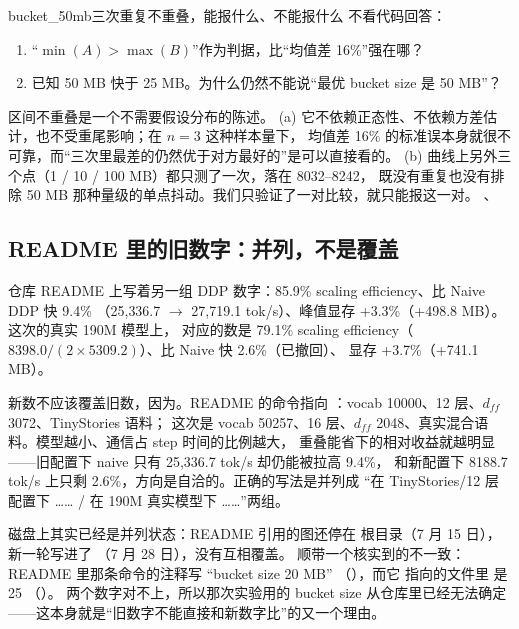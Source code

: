 \begin{checkpoint}{bucket_50mb}{三次重复不重叠，能报什么、不能报什么}
不看代码回答：
\begin{enumerate}[label=(\alph*)]
  \item “$\min(A) > \max(B)$”作为判据，比“均值差 16\%”强在哪？
  \item 已知 50 MB 快于 25 MB。为什么仍然不能说“最优 bucket size 是 50 MB”？
\end{enumerate}
\hint 区间不重叠是一个不需要假设分布的陈述。
\ifshowanswers
\tcblower
\answer (a) 它不依赖正态性、不依赖方差估计，也不受重尾影响；在 $n=3$ 这种样本量下，
均值差 16\% 的标准误本身就很不可靠，而“三次里最差的仍然优于对方最好的”是可以直接看的。
(b) 曲线上另外三个点（1 / 10 / 100 MB）都只测了一次，落在 8032--8242，
既没有重复也没有排除 50 MB 那种量级的单点抖动。我们只验证了一对比较，就只能报这一对。
\whereincode {}、
\fi
\end{checkpoint}

\subsection{README 里的旧数字：并列，不是覆盖}
\label{subsec:readme-old}

仓库 README 上写着另一组 DDP 数字：85.9\% scaling efficiency、比 Naive DDP 快 9.4\%
（25{,}336.7 $\to$ 27{,}719.1 tok/s）、峰值显存 +3.3\%（+498.8 MB）。这次的真实 190M 模型上，
对应的数是 79.1\% scaling efficiency（$8398.0 / (2\times5309.2)$）、比 Naive 快 2.6\%（已撤回）、
显存 +3.7\%（+741.1 MB）。

新数不应该覆盖旧数，因为。README 的命令指向
：vocab 10000、12 层、$d_{ff}$ 3072、TinyStories 语料；
这次是 vocab 50257、16 层、$d_{ff}$ 2048、真实混合语料。模型越小、通信占 step 时间的比例越大，
重叠能省下的相对收益就越明显——旧配置下 naive 只有 25{,}336.7 tok/s 却仍能被拉高 9.4\%，
和新配置下 8188.7 tok/s 上只剩 2.6\%，方向是自洽的。正确的写法是并列成
“在 TinyStories/12 层配置下 …… / 在 190M 真实模型下 ……”两组。

磁盘上其实已经是并列状态：README 引用的图还停在  根目录（7 月 15 日），
新一轮写进了 （7 月 28 日），没有互相覆盖。
顺带一个核实到的不一致：README 里那条命令的注释写 “bucket size 20 MB”
（），而它  指向的文件里  是 25
（）。
两个数字对不上，所以那次实验用的 bucket size 从仓库里已经无法确定——这本身就是“旧数字不能直接和新数字比”的又一个理由。

